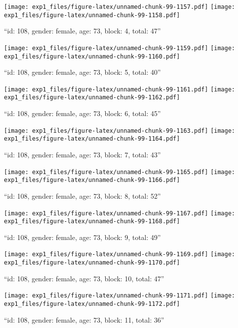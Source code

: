 \documentclass[,]{article}
\begin{document}
\texttt{[image: exp1\_files/figure-latex/unnamed-chunk-99-1157.pdf]}
\texttt{[image: exp1\_files/figure-latex/unnamed-chunk-99-1158.pdf]}

\newpage
[1] 

``id: 108, gender: female, age: 73, block: 4, total: 47''

\texttt{[image: exp1\_files/figure-latex/unnamed-chunk-99-1159.pdf]}
\texttt{[image: exp1\_files/figure-latex/unnamed-chunk-99-1160.pdf]}

\newpage
[1] 

``id: 108, gender: female, age: 73, block: 5, total: 40''

\texttt{[image: exp1\_files/figure-latex/unnamed-chunk-99-1161.pdf]}
\texttt{[image: exp1\_files/figure-latex/unnamed-chunk-99-1162.pdf]}

\newpage
[1] 

``id: 108, gender: female, age: 73, block: 6, total: 45''

\texttt{[image: exp1\_files/figure-latex/unnamed-chunk-99-1163.pdf]}
\texttt{[image: exp1\_files/figure-latex/unnamed-chunk-99-1164.pdf]}

\newpage
[1] 

``id: 108, gender: female, age: 73, block: 7, total: 43''

\texttt{[image: exp1\_files/figure-latex/unnamed-chunk-99-1165.pdf]}
\texttt{[image: exp1\_files/figure-latex/unnamed-chunk-99-1166.pdf]}

\newpage
[1] 

``id: 108, gender: female, age: 73, block: 8, total: 52''

\texttt{[image: exp1\_files/figure-latex/unnamed-chunk-99-1167.pdf]}
\texttt{[image: exp1\_files/figure-latex/unnamed-chunk-99-1168.pdf]}

\newpage
[1] 

``id: 108, gender: female, age: 73, block: 9, total: 49''

\texttt{[image: exp1\_files/figure-latex/unnamed-chunk-99-1169.pdf]}
\texttt{[image: exp1\_files/figure-latex/unnamed-chunk-99-1170.pdf]}

\newpage
[1] 

``id: 108, gender: female, age: 73, block: 10, total: 47''

\texttt{[image: exp1\_files/figure-latex/unnamed-chunk-99-1171.pdf]}
\texttt{[image: exp1\_files/figure-latex/unnamed-chunk-99-1172.pdf]}

\newpage
[1] 

``id: 108, gender: female, age: 73, block: 11, total: 36''
\end{document}
